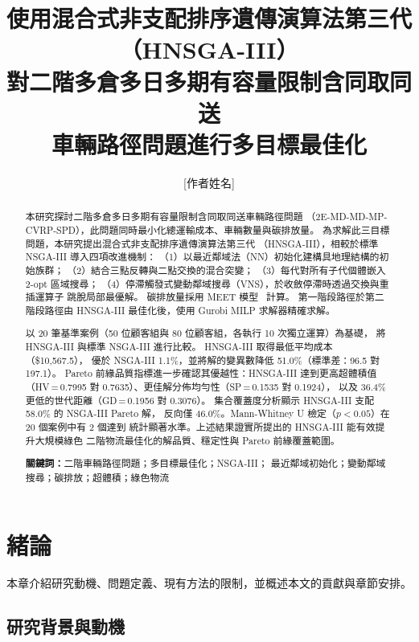 \documentclass[11pt, a4paper]{article}
\title{\textbf{使用混合式非支配排序遺傳演算法第三代（HNSGA-III）\\
對二階多倉多日多期有容量限制含同取同送\\
車輛路徑問題進行多目標最佳化}}
\author{[作者姓名]}
\date{}
\numberwithin{equation}{section}
\begin{document}
\maketitle
\thispagestyle{fancy}

\begin{abstract}
本研究探討二階多倉多日多期有容量限制含同取同送車輛路徑問題
（2E-MD-MD-MP-CVRP-SPD），此問題同時最小化總運輸成本、車輛數量與碳排放量。
為求解此三目標問題，本研究提出混合式非支配排序遺傳演算法第三代
（HNSGA-III），相較於標準 NSGA-III 導入四項改進機制：
（1）以最近鄰域法（NN）初始化建構具地理結構的初始族群；
（2）結合三點反轉與二點交換的混合突變；
（3）每代對所有子代個體嵌入 2-opt 區域搜尋；
（4）停滯觸發式變動鄰域搜尋（VNS），於收斂停滯時透過交換與重插運算子
跳脫局部最優解。
碳排放量採用 MEET 模型~\cite{hickman1999} 計算。
第一階段路徑於第二階段路徑由 HNSGA-III 最佳化後，使用 Gurobi MILP
求解器精確求解。

以 20 筆基準案例（50 位顧客組與 80 位顧客組，各執行 10 次獨立運算）為基礎，
將 HNSGA-III 與標準 NSGA-III 進行比較。
HNSGA-III 取得最低平均成本（\$10{,}567.5），
優於 NSGA-III 1.1\%，並將解的變異數降低 51.0\%（標準差：96.5 對 197.1）。
Pareto 前緣品質指標進一步確認其優越性：HNSGA-III 達到更高超體積值
（HV\,=\,0.7995 對 0.7635）、更佳解分佈均勻性（SP\,=\,0.1535 對 0.1924），
以及 36.4\% 更低的世代距離（GD\,=\,0.1956 對 0.3076）。
集合覆蓋度分析顯示 HNSGA-III 支配 58.0\% 的 NSGA-III Pareto 解，
反向僅 46.0\%。Mann-Whitney U 檢定（$p<0.05$）在 20 個案例中有 2 個達到
統計顯著水準。上述結果證實所提出的 HNSGA-III 能有效提升大規模綠色
二階物流最佳化的解品質、穩定性與 Pareto 前緣覆蓋範圍。

\medskip
\noindent\textbf{關鍵詞：}二階車輛路徑問題；多目標最佳化；NSGA-III；
最近鄰域初始化；變動鄰域搜尋；碳排放；超體積；綠色物流
\end{abstract}

\section{緒論}
\label{sec:intro}

本章介紹研究動機、問題定義、現有方法的限制，並概述本文的貢獻與章節安排。

\subsection{研究背景與動機}
\end{document}
